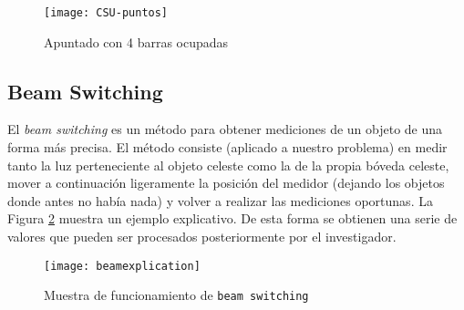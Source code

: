 \begin{figure}[!htb]
\centering
\texttt{[image: CSU-puntos]}
\caption{Apuntado con 4 barras ocupadas}
\label{fig:CSU2}
\end{figure}

\subsection{Beam Switching}

El \textit{beam switching} es un método para obtener mediciones de un objeto de
una forma más precisa. El método consiste (aplicado a nuestro problema) en medir
tanto la luz perteneciente al objeto celeste como la de la propia bóveda
celeste, mover a continuación ligeramente la posición del medidor (dejando los
objetos donde antes no había nada) y volver a realizar las mediciones oportunas.
La Figura \ref{fig:beams} muestra un ejemplo explicativo. De esta forma se
obtienen una serie de valores que pueden ser procesados posteriormente por el
investigador.

\begin{figure}[!htb]
\centering
\texttt{[image: beamexplication]}
\caption{Muestra de funcionamiento de \texttt{beam switching}}
\label{fig:beams}
\end{figure}

